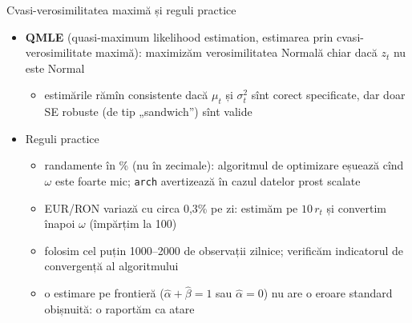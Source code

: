 \begin{frame}{Cvasi-verosimilitatea maximă și reguli practice}
\itemsize{\small}
\begin{itemize}
    \item \textbf{QMLE} (quasi-maximum likelihood estimation, estimarea prin cvasi-verosimilitate maximă): maximizăm verosimilitatea Normală chiar dacă $z_t$ nu este Normal
    \begin{itemize}
        \item estimările rămîn consistente dacă $\mu_t$ și $\sigma_t^2$ sînt corect specificate, dar doar SE robuste (de tip „sandwich”) sînt valide 
    \end{itemize}
    \item Reguli practice
    \begin{itemize}
        \item randamente în \% (nu în zecimale): algoritmul de optimizare eșuează cînd $\omega$ este foarte mic; \texttt{arch} avertizează în cazul datelor prost scalate
        \item EUR/RON variază cu circa 0,3\% pe zi: estimăm pe $10\,r_t$ și convertim înapoi $\omega$ (împărțim la 100)
        \item folosim cel puțin 1000--2000 de observații zilnice; verificăm indicatorul de convergență al algoritmului
        \item o estimare pe frontieră ($\hat\alpha + \hat\beta = 1$ sau $\hat\alpha = 0$) nu are o eroare standard obișnuită: o raportăm ca atare
    \end{itemize}
\end{itemize}
\end{frame}

